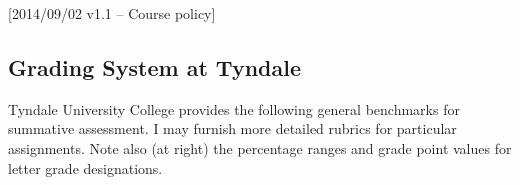 [2014/09/02 v1.1 -- Course policy]

\subsection{Grading System at Tyndale}
\label{grades}

Tyndale University College provides the following general benchmarks for
summative assessment. I may furnish more detailed rubrics for particular
assignments. Note also (at right) the percentage ranges and grade point values
for letter grade designations.


